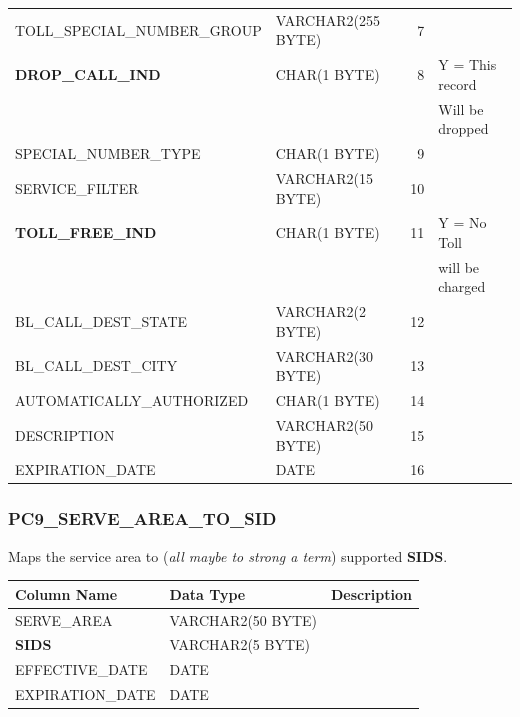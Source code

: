 \documentclass[12pt,twoside]{article}
\begin{document}
\begin{center}
\begin{tabular}{llrl}
 TOLL\_SPECIAL\_NUMBER\_GROUP  &  VARCHAR2(255 BYTE)  &            7  &                        \\
 \textbf{DROP\_CALL\_IND}      &  CHAR(1 BYTE)        &            8  &  Y = This record       \\
                               &                      &               &  Will be dropped       \\
 SPECIAL\_NUMBER\_TYPE         &  CHAR(1 BYTE)        &            9  &                        \\
 SERVICE\_FILTER               &  VARCHAR2(15 BYTE)   &           10  &                        \\
 \textbf{TOLL\_FREE\_IND}      &  CHAR(1 BYTE)        &           11  &  Y = No Toll           \\
                               &                      &               &  will be charged       \\
 BL\_CALL\_DEST\_STATE         &  VARCHAR2(2 BYTE)    &           12  &                        \\
 BL\_CALL\_DEST\_CITY          &  VARCHAR2(30 BYTE)   &           13  &                        \\
 AUTOMATICALLY\_AUTHORIZED     &  CHAR(1 BYTE)        &           14  &                        \\
 DESCRIPTION                   &  VARCHAR2(50 BYTE)   &           15  &                        \\
 EXPIRATION\_DATE              &  DATE                &           16  &                        \\
\hline
\end{tabular}
\end{center}




\normalsize
\subsubsection{PC9\_SERVE\_AREA\_TO\_SID}
\label{sec-9-14-4}

   Maps the service area to (\emph{all maybe to strong a term})  supported \textbf{SIDS}.
\scriptsize

\begin{center}
\begin{tabular}{lll}
\hline
 \textbf{Column Name}  &  \textbf{Data Type}  &  \textbf{Description}  \\
\hline
 SERVE\_AREA           &  VARCHAR2(50 BYTE)   &                        \\
 \textbf{SIDS}         &  VARCHAR2(5 BYTE)    &                        \\
 EFFECTIVE\_DATE       &  DATE                &                        \\
 EXPIRATION\_DATE      &  DATE                &                        \\
\hline
\end{tabular}
\end{center}
\end{document}
